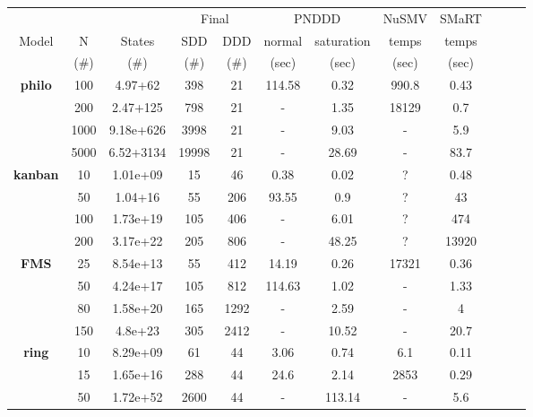 \begin{tabular}{|c||c|c|c|c|c|c|c|c|c|c|c|}
\hline
        &  	&    	    & \multicolumn{2}{c|}{Final}  &  \multicolumn{2}{c|}{PNDDD}    & NuSMV & SMaRT \\
\cline{4-7}
Model       & N    & States    & SDD    & DDD  &normal&  saturation&  temps & temps   \\  
        &(\#)  & (\#)      	& (\#)  	&  (\#)  	&  (sec)&  (sec)     &  (sec)   &  (sec)    \\
\hline
\textbf{philo} 
&	100 & 4.97+62 & 398 & 21 &  114.58 & 0.32  & 990.8&  0.43 \\ 	
&  	200 & 2.47+125 & 798 & 21  &  - & 1.35 & 18129& 0.7 \\ 
&	1000 & 9.18e+626 & 3998 & 21  &- & 9.03  & - & 5.9  \\
&  5000	     & 6.52+3134 & 19998 & 21 & - & 28.69 & - & 83.7 \\
\hline
\textbf{kanban} 
&	10 & 1.01e+09 & 15 & 46 & 0.38& 0.02 &? & 0.48\\ 
&	50 & 1.04+16 & 55 & 206 &  93.55& 0.9 & ? & 43  \\ 
&	100& 1.73e+19 & 105 & 406 &  - & 6.01 &? & 474 \\ 
&       200& 3.17e+22 & 205 & 806 & - & 48.25 & ? & 13920 \\ 
\hline
\textbf{FMS} 
&       25 & 8.54e+13 & 55 & 412 & 14.19 &  0.26 & 17321 &0.36  \\
&	50 & 4.24e+17 & 105 & 812 &114.63 & 1.02  & - &  1.33 \\ 
&	80 & 1.58e+20 & 165 & 1292 &   -  & 2.59  & - &  4 \\ 
&       150& 4.8e+23 &  305 & 2412 &   -  & 10.52 & - &    20.7         \\
\hline
\textbf{ring}
&	10  & 8.29e+09 & 61 & 44 & 3.06 & 0.74 & 6.1  &0.11  \\ 
&	15 & 1.65e+16 & 288 & 44 & 24.6 & 2.14 & 2853    &0.29 \\ 
&     50     & 1.72e+52 & 2600 & 44 & - & 113.14  & - & 5.6 \\
\hline
\end{tabular}
